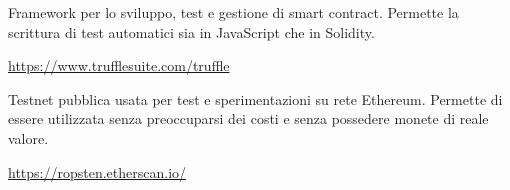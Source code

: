 	Framework per lo sviluppo, test e gestione di smart contract. Permette la scrittura di test automatici sia in JavaScript che in Solidity. 
	\begin{center}
		\url{https://www.trufflesuite.com/truffle}
	\end{center}

	Testnet pubblica usata per test e sperimentazioni su rete Ethereum. Permette di essere utilizzata senza preoccuparsi dei costi e senza possedere monete di reale valore. 
	\begin{center}
		\url{https://ropsten.etherscan.io/}
	\end{center}